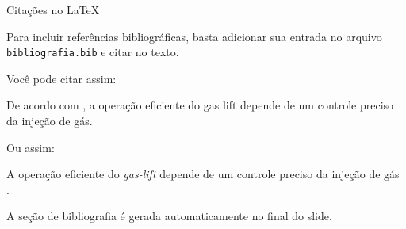 \begin{frame}{Citações no \LaTeX}

  Para incluir referências bibliográficas, basta adicionar sua entrada no arquivo \texttt{bibliografia.bib} e citar no texto.

  \vspace{4mm}

  Você pode citar assim:

  De acordo com , a operação eficiente do gas lift depende de um controle preciso da injeção de gás.

  \vspace{2mm}

  Ou assim:

  A operação eficiente do \textit{gas-lift} depende de um controle preciso da injeção de gás \cite{araujo_2025}.

  \vspace{2mm}

  A seção de bibliografia é gerada automaticamente no final do slide.
\end{frame}

